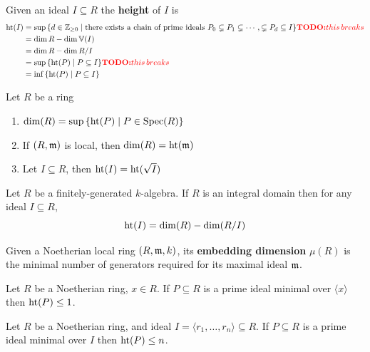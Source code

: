 \documentclass[12pt]{amsart}
\begin{document}
\begin{definition}
    Given an ideal $I \subseteq R$ the \textbf{height} of $I$ is 
    \begin{align*}
        \operatorname{\text{ht}}(I) &= \sup \, \{d \in \mathbb Z_{\geq 0} \mid \text{there exists a chain of prime ideals } P_0 \subsetneq P_1 \subsetneq \cdots, \subsetneq P_d \subseteq I\}  \textcolor{red}{\textbf{TODO:} this \, breaks} \\ 
        &= \dim R - \dim \mathbb V(I)   \\ 
        &= \dim R - \dim R/I \\
        &= \sup  \, \{\operatorname{\text{ht}} (P) \mid P \subseteq I\} \textcolor{red}{\textbf{TODO:} this \, breaks}\\
        &= \inf  \, \{\operatorname{\text{ht}} (P) \mid P \subseteq I\}
    \end{align*}
\end{definition}

\begin{lemma}
    Let $R$ be a ring
    \begin{enumerate}
        \item $\dim(R) = \sup \, \{ \operatorname{\text{ht}} (P) \mid P \in \operatorname{Spec}(R)\}$
        \item If $(R, \operatorname{\mathfrak{m}})$ is local, then $\dim(R) = \operatorname{\text{ht}}(\operatorname{\mathfrak{m}})$
        \item Let $I \subseteq R$, then $\operatorname{\text{ht}} (I) = \operatorname{\text{ht}} (\sqrt{I})$
    \end{enumerate}
\end{lemma}

\begin{theorem}
    Let $R$ be a finitely-generated $k$-algebra. If $R$ is an integral domain then for any ideal $I \subseteq R$, 
    \[\operatorname{\text{ht}} (I) = \dim(R) - \dim(R/I)\]
\end{theorem}

\begin{definition}
    Given a Noetherian local ring $(R, \operatorname{\mathfrak{m}}, k)$, its \textbf{embedding dimension} $\mu(R)$ is the minimal number of generators required for its maximal ideal $\operatorname{\mathfrak{m}}$.  
\end{definition}

\begin{theorem}
    Let $R$ be a Noetherian ring, $x \in R$. If $P \subseteq R$ is a prime ideal minimal over $\langle x \rangle$ then  $\operatorname{\text{ht}}(P) \leq 1$. 
\end{theorem}

\begin{corollary}
    Let $R$ be a Noetherian ring, and ideal  $I = \langle r_1, \ldots, r_n \rangle \subseteq R$. If $P \subseteq R$ is a prime ideal minimal over $I$ then $\operatorname{\text{ht}}(P) \leq n$.  
\end{corollary}
\end{document}
